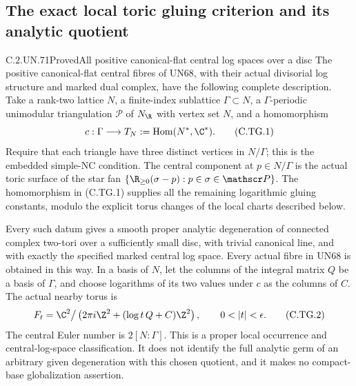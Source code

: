 \subsection{The exact local toric gluing criterion and its analytic quotient}

\begin{statement}{C.2.UN.71}{Proved}{All positive canonical-flat central log spaces over a disc}
The positive canonical-flat central fibres of UN68,
with their actual divisorial log structure and marked
dual complex, have the following complete description.
Take a rank-two lattice $N$, a finite-index sublattice
$\Gamma\subset N$, a $\Gamma$-periodic unimodular
triangulation $\mathscr P$ of $N_{\R}$ with vertex set
$N$, and a homomorphism
\[
       c:\Gamma\longrightarrow T_N
          :=\operatorname{Hom}(N^*,\C^*).
\tag{C.TG.1}
\]
Require that each triangle have three distinct vertices
in $N/\Gamma$; this is the embedded simple-NC condition.
The central component at $p\in N/\Gamma$ is the actual
toric surface of the star fan
$\{\R_{\ge0}(\sigma-p):p\in\sigma\in\mathscr P\}$.
The homomorphism in (C.TG.1) supplies all the remaining
logarithmic gluing constants, modulo the explicit torus
changes of the local charts described below.

Every such datum gives a smooth proper analytic
degeneration of connected complex two-tori over a
sufficiently small disc, with trivial canonical line,
and with exactly the specified marked central log space.
Every actual fibre in UN68 is obtained in this way.
In a basis of $N$, let the columns of the integral
matrix $Q$ be a basis of $\Gamma$, and choose logarithms
of its two values under $c$ as the columns of $C$.
The actual nearby torus is
\[
 F_t=\C^2\big/
       \left(2\pi i\Z^2+(\log t\,Q+C)\Z^2\right),
       \qquad 0<|t|<\epsilon .
\tag{C.TG.2}
\]
The central Euler number is $2[N:\Gamma]$.
This is a proper local occurrence and central-log-space
classification. It does not identify the full analytic
germ of an arbitrary given degeneration with this
chosen quotient, and it makes no compact-base
globalization assertion.
\end{statement}

